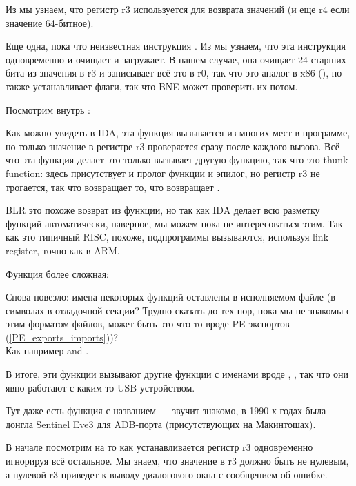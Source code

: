 Из \PPCABI мы узнаем, что регистр r3 используется для возврата
значений (и еще r4 если значение 64-битное).

Еще одна, пока что неизвестная инструкция . 
Из \PPC мы узнаем, что эта инструкция одновременно и очищает и загружает. 
В нашем случае, она очищает 24 старших бита из значения в r3 и записывает всё это в r0, 
так что это аналог \MOVZX в x86 (),
но также устанавливает флаги, так что \ac{BNE} 
может проверить их потом.

Посмотрим внутрь :



Как можно увидеть в \ac{IDA}, эта функция вызывается из многих мест в программе, но только значение
в регистре r3 проверяется сразу после каждого вызова.
Всё что эта функция делает это только вызывает другую функцию, так что это \gls{thunk function}: 
здесь присутствует и пролог функции и эпилог, но регистр r3 не трогается, так что  
возвращает то, что возвращает .

\ac{BLR} это похоже возврат из функции, но так как IDA делает всю разметку функций автоматически,
наверное, мы можем пока не интересоваться этим.
Так как это типичный \ac{RISC}, похоже, подпрограммы вызываются, используя \gls{link register}, точно как в ARM.

Функция  более сложная:



Снова повезло: имена некоторых функций оставлены в исполняемом файле
(в символах в отладочной секции? Трудно сказать до тех пор, пока мы не знакомы с этим форматом файлов,
может быть это что-то вроде PE-экспортов (\ref{PE_exports_imports}))?\\ %
Как например  and .

В итоге, эти функции вызывают другие функции с именами вроде , 
,
так что они явно работают с каким-то USB-устройством.

Тут даже есть функция с названием 
 --- звучит знакомо, в 1990-х годах была донгла Sentinel Eve3 
для ADB-порта (присутствующих на Макинтошах).

В начале посмотрим на то как устанавливается регистр r3 одновременно игнорируя всё остальное.
Мы знаем, что  значение в r3 должно быть не нулевым, а нулевой r3 приведет
к выводу диалогового окна с сообщением об ошибке.

